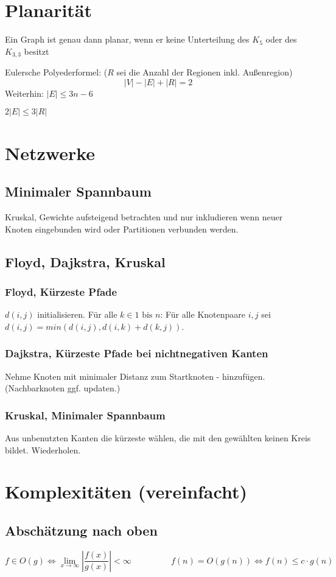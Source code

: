 \documentclass[10pt,a4paper]{article}
\newcommand{\abs}[1]{\ensuremath{\left\vert#1\right\vert}}
\begin{document}
\section{Planarität}
Ein Graph ist genau dann planar, wenn er keine Unterteilung des $K_5$ oder des $K_{3,3}$ besitzt

Eulersche Polyederformel: ($R$ sei die Anzahl der Regionen inkl. Außenregion)
\[|V|-|E|+|R|=2\]
Weiterhin: $|E| \leq 3n -6$

$2|E| \leq 3|R|$
\section{Netzwerke}
\subsection{Minimaler Spannbaum}
Kruskal, Gewichte aufsteigend betrachten und nur inkludieren wenn neuer Knoten eingebunden wird oder Partitionen verbunden werden.
\subsection{Floyd, Dajkstra, Kruskal}
\subsubsection{Floyd, Kürzeste Pfade}
$d(i,j)$ initialisieren. Für alle $k \in 1 \mbox{ bis } n$: Für alle Knotenpaare $i, j$ sei $d(i, j) = min (d(i,j), d(i,k) + d(k,j))$.
\subsubsection{Dajkstra, Kürzeste Pfade bei nichtnegativen Kanten}
Nehme Knoten mit minimaler Distanz zum Startknoten - hinzufügen. (Nachbarknoten ggf. updaten.)
\subsubsection{Kruskal, Minimaler Spannbaum}
Aus unbenutzten Kanten die kürzeste wählen, die mit den gewählten keinen Kreis bildet. Wiederholen.
\section{Komplexitäten (vereinfacht)}
\subsection{Abschätzung nach oben}
\[f \in O(g) \Leftrightarrow \lim_{x \rightarrow \infty} \abs{\frac{f(x)}{g(x)}} < \infty  \,\,\,\,\,\,\,\,\,\,\,\,\,\,\,\,\,\,\,\,\,\,\,\,\,\,\,\, f(n) = O(g(n)) \Leftrightarrow f(n) \leq c \cdot g(n)\]
\end{document}
